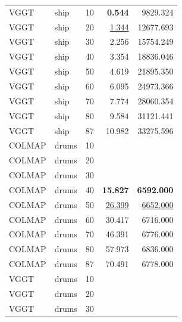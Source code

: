 \begin{table}[H]
\begin{tabular}{llrrr}
VGGT & ship & 10 & \textbf{0.544} & 9829.324 \\
VGGT & ship & 20 & \underline{1.344} & 12677.693 \\
VGGT & ship & 30 & 2.256 & 15754.249 \\
VGGT & ship & 40 & 3.354 & 18836.046 \\
VGGT & ship & 50 & 4.619 & 21895.350 \\
VGGT & ship & 60 & 6.095 & 24973.366 \\
VGGT & ship & 70 & 7.774 & 28060.354 \\
VGGT & ship & 80 & 9.584 & 31121.441 \\
VGGT & ship & 87 & 10.982 & 33275.596 \\
\midrule
COLMAP & drums & 10 &  &  \\
COLMAP & drums & 20 &  &  \\
COLMAP & drums & 30 &  &  \\
COLMAP & drums & 40 & \textbf{15.827} & \textbf{6592.000} \\
COLMAP & drums & 50 & \underline{26.399} & \underline{6652.000} \\
COLMAP & drums & 60 & 30.417 & 6716.000 \\
COLMAP & drums & 70 & 46.391 & 6776.000 \\
COLMAP & drums & 80 & 57.973 & 6836.000 \\
COLMAP & drums & 87 & 70.491 & 6778.000 \\
VGGT & drums & 10 &  &  \\
VGGT & drums & 20 &  &  \\
VGGT & drums & 30 &  &  \\
\bottomrule
\end{tabular}
\end{table}